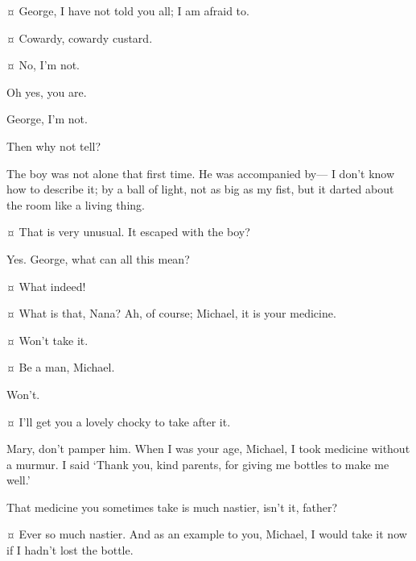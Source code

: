 \begin{drama}
\mrsdarlingspeaks {}¤
George, I have not told you all; I am afraid to.

\mrdarlingspeaks {}¤
Cowardy, cowardy custard.

\mrsdarlingspeaks {}¤
No, I’m not.

\mrdarlingspeaks
Oh yes, you are.

\mrsdarlingspeaks
George, I’m not.

\mrdarlingspeaks
Then why not tell?

\mrsdarlingspeaks
The boy was not alone that first time.
He was accompanied by—%
I don’t know how to describe it;
by a ball of light, not as big as my fist, but it darted about the room like a living thing.

\mrdarlingspeaks {}¤
That is very unusual.
It escaped with the boy?

\mrsdarlingspeaks
Yes.
George, what can all this mean?

\mrdarlingspeaks {}¤
What indeed!


\mrsdarlingspeaks {}¤
What is that, Nana?
Ah, of course; Michael, it is your medicine.

\michaelspeaks {}¤
Won’t take it.

\mrdarlingspeaks {}¤
Be a man, Michael.

\michaelspeaks
Won’t.

\mrsdarlingspeaks {}¤
I’ll get you a lovely chocky to take after it.

\mrdarlingspeaks
Mary, don’t pamper him.
When I was your age, Michael, I took medicine without a murmur.
I said ‘Thank you, kind parents, for giving me bottles to make me well.’


\wendyspeaks
That medicine you sometimes take is much nastier, isn’t it, father?

\mrdarlingspeaks {}¤
Ever so much nastier.
And as an example to you, Michael, I would take it now
if I hadn’t lost the bottle.


\end{drama}
